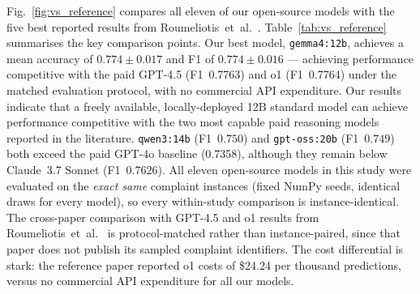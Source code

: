 \documentclass[a4paper,fleqn]{cas-dc}
\begin{document}
Fig.~\ref{fig:vs_reference} compares all eleven of our open-source
models with the five best reported results from Roumeliotis~et~al.\
\cite{roumeliotis2025think}. Table~\ref{tab:vs_reference} summarises
the key comparison points. Our best model, \texttt{gemma4:12b},
achieves a mean accuracy of $0.774 \pm 0.017$ and F1 of $0.774 \pm 0.016$
--- achieving performance competitive with the paid GPT-4.5 (F1~0.7763)
and o1 (F1~0.7764) under the matched evaluation protocol, with no
commercial API expenditure. Our results indicate that a freely
available, locally-deployed 12B standard model can achieve performance
competitive with the two most capable paid reasoning models reported
in the literature.
\texttt{qwen3:14b} (F1~$0.750$) and \texttt{gpt-oss:20b} (F1~$0.749$)
both exceed the paid GPT-4o baseline (0.7358), although they remain
below Claude~3.7 Sonnet (F1~0.7626).
All eleven open-source models in this study were evaluated on the
\emph{exact same} complaint instances (fixed NumPy seeds, identical
draws for every model), so every within-study comparison is
instance-identical. The cross-paper comparison with GPT-4.5 and o1
results from Roumeliotis~et~al.\ \cite{roumeliotis2025think} is
protocol-matched rather than instance-paired, since that paper does
not publish its sampled complaint identifiers.
The cost differential is stark: the reference paper reported
o1 costs of \$24.24 per thousand predictions, versus no commercial
API expenditure for all our models.
\end{document}
